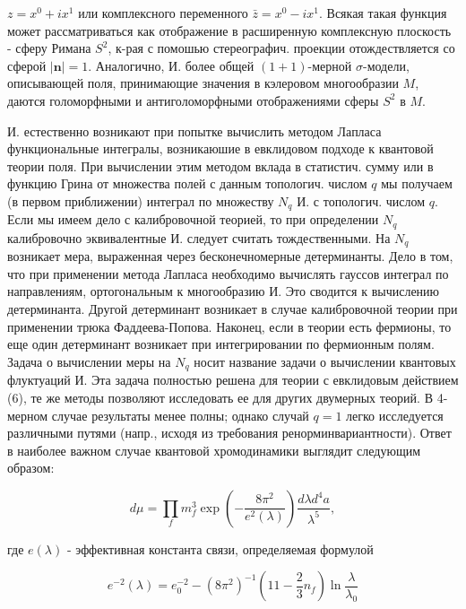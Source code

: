 \documentclass[10pt]{article}
\begin{document}
$z=x^{0}+i x^{1}$ или комплексного переменного $\bar{z}=x^{0}-i x^{1}$. Всякая такая функция может рассматриваться как отображение в расширенную комплексную плоскость - сферу Римана $S^{2}$, к-рая с помошью стереографич. проекции отождествляется со сферой $|\boldsymbol{n}|=1$. Аналогично, И. более общей $(1+1)$-мерной $\sigma$-модели, описывающей поля, принимающие значения в кэлеровом многообразии $M$, даются голоморфными и антиголоморфными отображениями сферы $S^{2}$ в $M$.



И. естественно возникают при попытке вычислить методом Лапласа функциональные интегралы, возникаюшие в евклидовом подходе к квантовой теории поля. При вычислении этим методом вклада в статистич. сумму или в функцию Грина от множества полей с данным топологич. числом $q$ мы получаем (в первом приближении) интеграл по множеству $N_{q}$ И. с топологич. числом $q$. Если мы имеем дело с калибровочной теорией, то при определении $N_{q}$ калибровочно эквивалентные И. следует считать тождественными. На $N_{q}$ возникает мера, выраженная через бесконечномерные детерминанты. Дело в том, что при применении метода Лапласа необходимо вычислять гауссов интеграл по направлениям, ортогональным к многообразию И. Это сводится к вычислению детерминанта. Другой детерминант возникает в случае калибровочной теории при применении трюка Фаддеева-Попова. Наконец, если в теории есть фермионы, то еще один детерминант возникает при интегрировании по фермионным полям. Задача о вычислении меры на $N_{q}$ носит название задачи о вычислении квантовых флуктуаций И. Эта задача полностью решена для теории с евклидовым действием (6), те же методы позволяют исследовать ее для других двумерных теорий. В 4-мерном случае результаты менее полны; однако случай $q=1$ легко исследуется различными путями (напр., исходя из требования ренорминвариантности). Ответ в наиболее важном случае квантовой хромодинамики выглядит следующим образом:



\[

d \mu=\prod_{f} m_{f}^{3} \exp \left(-\frac{8 \pi^{2}}{e^{2}(\lambda)}\right) \frac{d \lambda d^{4} a}{\lambda^{5}},

\]



где $e(\lambda)$ - эффективная константа связи, определяемая формулой



\[

e^{-2}(\lambda)=e_{0}^{-2}-\left(8 \pi^{2}\right)^{-1}\left(11-\frac{2}{3} n_{f}\right) \ln \frac{\lambda}{\lambda_{0}}

\]
\end{document}
